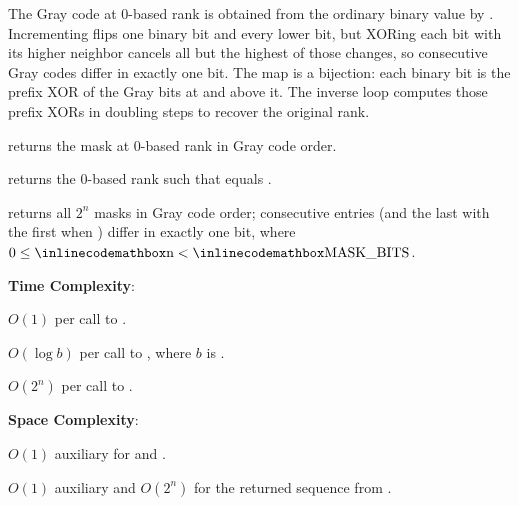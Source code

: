 The Gray code at 0-based rank  is obtained from the ordinary binary value  by . Incrementing  flips one binary bit and every lower bit, but XORing each bit with its higher neighbor cancels all but the highest of those changes, so consecutive Gray codes differ in exactly one bit. The map is a bijection: each binary bit is the prefix XOR of the Gray bits at and above it. The inverse loop computes those prefix XORs in doubling steps to recover the original rank.

\begin{compactitem}
  \item {} returns the mask at 0-based rank  in Gray code order.
  \item {} returns the 0-based rank  such that  equals .
  \item {} returns all $2^n$ masks in Gray code order; consecutive entries (and the last with the first when ) differ in exactly one bit, where $0 \leq {\inlinecodemath{n}} < {\inlinecodemath{MASK\_BITS}}$.
\end{compactitem}

\textbf{Time Complexity}:
\begin{compactitem}
  \item $O(1)$ per call to .
  \item $O(\log b)$ per call to , where $b$ is .
  \item $O(2^{n})$ per call to .
\end{compactitem}

\textbf{Space Complexity}:
\begin{compactitem}
  \item $O(1)$ auxiliary for  and .
  \item $O(1)$ auxiliary and $O(2^{n})$ for the returned sequence from .
\end{compactitem}

